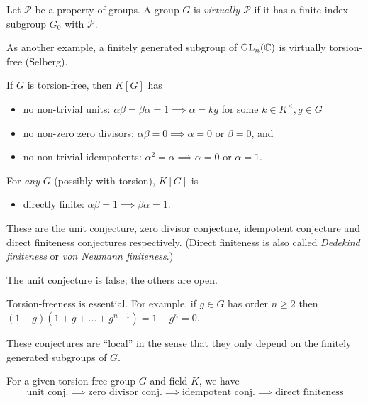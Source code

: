 \begin{definition}
    Let $\mathcal{P}$ be a property of groups.
    A group $G$ is \emph{virtually $\mathcal{P}$} if it has a finite-index subgroup $G_0$ with $\mathcal{P}$.
\end{definition}

As another example, a finitely generated subgroup of $\mathrm{GL}_n(\mathbb{C})$ is virtually torsion-free (Selberg).

\begin{conjecture}
    If $G$ is torsion-free, then $K[G]$ has
    \begin{itemize}
        \item no non-trivial units: $\alpha \beta = \beta \alpha = 1 \implies \alpha = kg$ for some $k \in K^\times, g \in G$
        \item no non-zero zero divisors: $\alpha \beta = 0 \implies \alpha = 0$ or $\beta = 0$, and
        \item no non-trivial idempotents: $\alpha^2 = \alpha \implies \alpha = 0$ or $\alpha = 1$.
    \end{itemize}
    For \emph{any} $G$ (possibly with torsion), $K[G]$ is
    \begin{itemize}
        \item directly finite: $\alpha \beta = 1 \implies \beta \alpha = 1$.
    \end{itemize}
\end{conjecture}

These are the unit conjecture, zero divisor conjecture, idempotent conjecture and direct finiteness conjectures respectively.
(Direct finiteness is also called \emph{Dedekind finiteness} or \emph{von Neumann finiteness}.)

\begin{remark}
    The unit conjecture is false; the others are open.
\end{remark}

\begin{remark}
    Torsion-freeness is essential. For example, if $g \in G$ has order $n \geq 2$ then $(1 - g)(1 + g + \dots + g^{n-1}) = 1 - g^n = 0$.
\end{remark}

\begin{remark}
    These conjectures are ``local'' in the sense that they only depend on the finitely generated subgroups of $G$.
\end{remark}

\begin{proposition}
    For a given torsion-free group $G$ and field $K$, we have \[
        \text{unit conj.} \implies
        \text{zero divisor conj.} \implies
        \text{idempotent conj.} \implies
        \text{direct finiteness}
    \]
\end{proposition}

